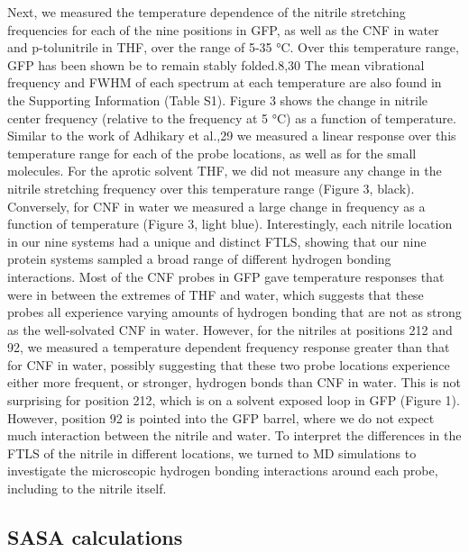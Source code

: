 Next, we measured the temperature dependence of the nitrile stretching frequencies for each of the nine positions in GFP, as well as the CNF in water and p-tolunitrile in THF, over the range of 5-35 \si{\celsius}.
Over this temperature range, GFP has been shown be to remain stably folded.8,30
The mean vibrational frequency and FWHM of each spectrum at each temperature are also found in the Supporting Information (Table S1).
Figure 3 shows the change in nitrile center frequency (relative to the frequency at 5 \si{\celsius}) as a function of temperature.
Similar to the work of Adhikary et al.,29 we measured a linear response over this temperature range for each of the probe locations, as well as for the small molecules.
For the aprotic solvent THF, we did not measure any change in the nitrile stretching frequency over this temperature range (Figure 3, black).
Conversely, for CNF in water we measured a large change in frequency as a function of temperature (Figure 3, light blue).
Interestingly, each nitrile location in our nine systems had a unique and distinct FTLS, showing that our nine protein systems sampled a broad range of different hydrogen bonding interactions.
Most of the CNF probes in GFP gave temperature responses that were in between the extremes of THF and water, which suggests that these probes all experience varying amounts of hydrogen bonding that are not as strong as the well-solvated CNF in water.
However, for the nitriles at positions 212 and 92, we measured a temperature dependent frequency response greater than that for CNF in water, possibly suggesting that these two probe locations experience either more frequent, or stronger, hydrogen bonds than CNF in water.
This is not surprising for position 212, which is on a solvent exposed loop in GFP (Figure 1).
However, position 92 is pointed into the GFP barrel, where we do not expect much interaction between the nitrile and water.
To interpret the differences in the FTLS of the nitrile in different locations, we turned to MD simulations to investigate the microscopic hydrogen bonding interactions around each probe, including to the nitrile itself. 

\subsection{SASA calculations}

